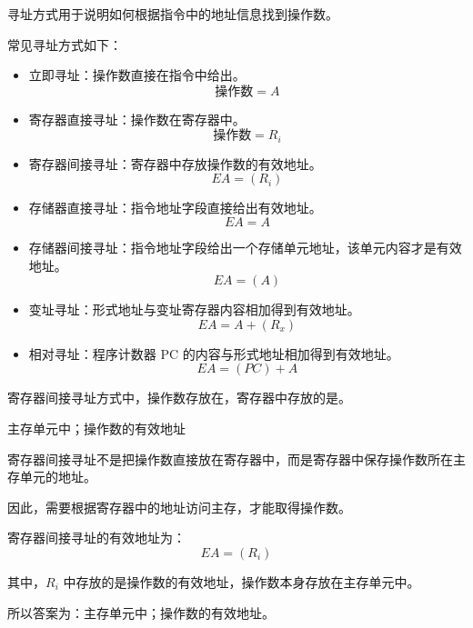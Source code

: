 \begin{knowledge}
寻址方式用于说明如何根据指令中的地址信息找到操作数。

常见寻址方式如下：

\begin{itemize}
    \item 立即寻址：操作数直接在指令中给出。
    \[
    \text{操作数}=A
    \]

    \item 寄存器直接寻址：操作数在寄存器中。
    \[
    \text{操作数}=R_i
    \]

    \item 寄存器间接寻址：寄存器中存放操作数的有效地址。
    \[
    EA=(R_i)
    \]

    \item 存储器直接寻址：指令地址字段直接给出有效地址。
    \[
    EA=A
    \]

    \item 存储器间接寻址：指令地址字段给出一个存储单元地址，该单元内容才是有效地址。
    \[
    EA=(A)
    \]

    \item 变址寻址：形式地址与变址寄存器内容相加得到有效地址。
    \[
    EA=A+(R_x)
    \]

    \item 相对寻址：程序计数器 PC 的内容与形式地址相加得到有效地址。
    \[
    EA=(PC)+A
    \]
\end{itemize}
\end{knowledge}




\begin{question}
寄存器间接寻址方式中，操作数存放在\underline{\hspace{3cm}}，寄存器中存放的是\underline{\hspace{3cm}}。
\end{question}

\begin{answer}
主存单元中；操作数的有效地址
\end{answer}

\begin{analysisenv}
寄存器间接寻址不是把操作数直接放在寄存器中，而是寄存器中保存操作数所在主存单元的地址。

因此，需要根据寄存器中的地址访问主存，才能取得操作数。

寄存器间接寻址的有效地址为：
\[
EA=(R_i)
\]

其中，$R_i$ 中存放的是操作数的有效地址，操作数本身存放在主存单元中。

所以答案为：主存单元中；操作数的有效地址。
\end{analysisenv}





